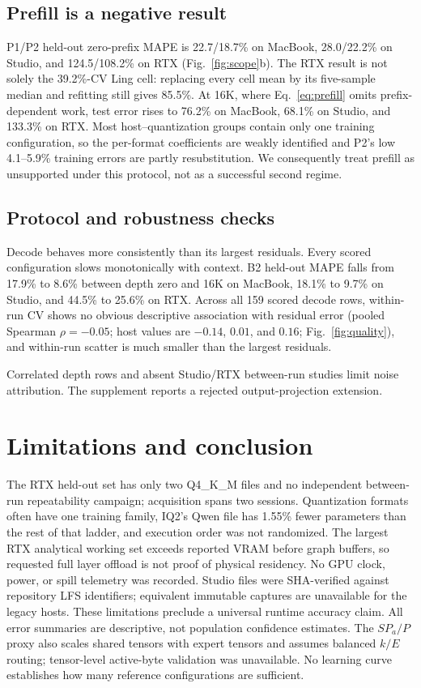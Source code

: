 \documentclass{article}
\begin{document}
\subsection{Prefill is a negative result}

P1/P2 held-out zero-prefix MAPE is 22.7/18.7\% on MacBook, 28.0/22.2\% on
Studio, and 124.5/108.2\% on RTX (Fig.~\ref{fig:scope}b).
The RTX result is not solely the 39.2\%-CV Ling cell:
replacing every cell mean by its five-sample median and refitting still gives
85.5\%.  At 16K, where Eq.~\eqref{eq:prefill} omits prefix-dependent work, test
error rises to 76.2\% on MacBook, 68.1\% on Studio, and 133.3\% on RTX.  Most
host--quantization groups contain only one training configuration, so the
per-format coefficients are weakly identified and P2's low 4.1--5.9\% training
errors are partly resubstitution.  We consequently treat prefill as
unsupported under this protocol, not as a successful second regime.

\subsection{Protocol and robustness checks}

Decode behaves more consistently than its largest residuals.  Every scored
configuration slows monotonically with context.  B2 held-out MAPE falls from
17.9\% to 8.6\% between depth zero and 16K on MacBook, 18.1\% to 9.7\% on Studio,
and 44.5\% to 25.6\% on RTX.  Across all 159 scored decode rows, within-run CV
shows no obvious descriptive association with residual error (pooled Spearman
$\rho=-0.05$; host values are $-0.14$, $0.01$, and $0.16$;
Fig.~\ref{fig:quality}), and within-run scatter is much smaller than the largest
residuals.

Correlated depth rows and absent Studio/RTX between-run studies limit noise
attribution.  The supplement reports a rejected output-projection extension.

\section{Limitations and conclusion}
\label{sec:conclusion}

The RTX held-out set has only two Q4\_K\_M files and no independent between-run
repeatability campaign; acquisition spans two sessions.  Quantization formats
often have one training family, IQ2's Qwen file has 1.55\% fewer parameters
than the rest of that ladder, and execution order was not randomized.  The
largest RTX analytical working set exceeds reported VRAM before graph buffers,
so requested full layer offload is not proof of physical residency.  No GPU
clock, power, or spill telemetry was recorded.  Studio files were SHA-verified
against repository LFS identifiers; equivalent immutable captures are
unavailable for the legacy hosts.  These limitations preclude a universal runtime
accuracy claim.  All error summaries are descriptive, not population confidence
estimates.  The $SP_a/P$ proxy also scales shared tensors with expert tensors
and assumes balanced $k/E$ routing; tensor-level active-byte validation was
unavailable.  No learning curve establishes how many reference configurations
are sufficient.
\end{document}
